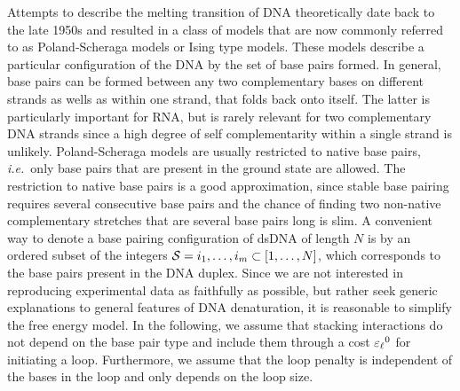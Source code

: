 Attempts to describe the melting transition of DNA theoretically date back to the late 1950s and
resulted in a class of models that are now commonly referred to as Poland-Scheraga models 
%
\cite{Zimm_JChemPhys_59, Zimm_JChemPhys_60, Poland_JChemPhys_66a, Poland_JChemPhys_66b} or Ising
type models. These models describe a particular configuration of the DNA by the set of base pairs formed. In general, 
base pairs can be formed between any two complementary bases on different strands 
as wells as within one strand, that folds back onto itself. The latter is particularly important for RNA, 
but is rarely relevant for two complementary DNA strands since a high 
degree of self complementarity within a single strand is unlikely. 
Poland-Scheraga models are usually restricted to native base pairs, \emph{i.e.}~only base pairs
that are present in the ground state are allowed. The restriction to native base pairs is a good approximation, since
stable base pairing requires several consecutive base pairs and the chance of finding two non-native complementary 
stretches that are several base pairs long is slim. A convenient way to denote a base pairing configuration 
of dsDNA of length $N$ is by an ordered subset of the integers ${\cal S}={i_1, \ldots, i_m}\subset[1,\ldots, N]$, 
which corresponds to the base pairs present in the DNA duplex.
Since we are not interested in reproducing experimental data as faithfully as possible, but rather
seek generic explanations to general features of DNA denaturation, it is reasonable to simplify the free energy 
model. In the following, we assume that stacking interactions do not depend on the base pair type
and include them through a cost ${\varepsilon_{\ell}}^{0}$ for initiating a loop. Furthermore, we assume that 
the loop penalty is independent of the bases in the loop and only depends on the loop size.  

